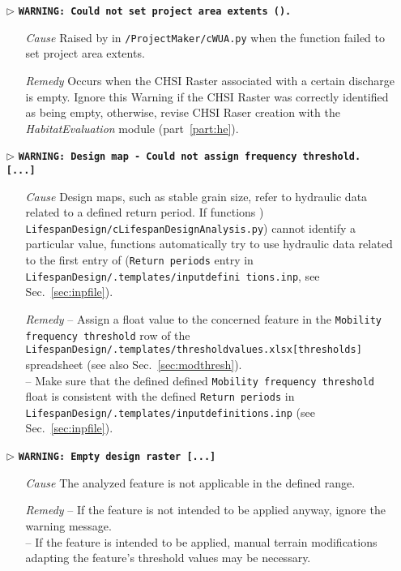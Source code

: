 \begin{itemize}
	\item[$\triangleright$]\textbf{\texttt{WARNING: Could not set project area extents ().}}
	\begin{itemize}
		\item[\textit{Cause}\hspace{0.27cm}] Raised by  in \texttt{/ProjectMaker/cWUA.py} when the function failed to set project area extents.
		\item[\textit{Remedy}] Occurs when the CHSI Raster associated with a certain discharge is empty. Ignore this Warning if the CHSI Raster was correctly identified as being empty, otherwise, revise CHSI Raser creation with the \textit{HabitatEvaluation} module (part~\ref{part:he}).\\		
	\end{itemize}
	
	\item[$\triangleright$]\textbf{\texttt{WARNING: Design map - Could not assign frequency threshold. [...]}}
	\begin{itemize}
		\item[\textit{Cause}\hspace{0.27cm}] Design maps, such as stable grain size, refer to hydraulic data related to a defined return period. If  functions ) \texttt{LifespanDesign/cLifespanDesignAnalysis.py}) cannot identify a particular  value,  functions automatically try to use hydraulic data related to the first entry of  (\texttt{Return periods} entry in \texttt{LifespanDesign/.templates/input{\myUnderscore}defini tions.inp}, see Sec.~\ref{sec:inpfile}).
		\item[\textit{Remedy}] -- Assign a float value to the concerned feature in the \texttt{Mobility frequency threshold} row of the \texttt{LifespanDesign/.templates/threshold{\myUnderscore}values.xlsx[thresholds]} spreadsheet (see also Sec.~\ref{sec:modthresh}).\\
			-- Make sure that the defined defined \texttt{Mobility frequency threshold} float is consistent with the defined \texttt{Return periods} in \texttt{LifespanDesign/.templates/input{\myUnderscore}definitions.inp} (see Sec.~\ref{sec:inpfile}).\\
	\end{itemize}
	
	\item[$\triangleright$]\textbf{\texttt{WARNING: Empty design raster [...]}}
	\begin{itemize}
		\item[\textit{Cause}\hspace{0.27cm}] The analyzed feature is not applicable in the defined range.
		\item[\textit{Remedy}] -- If the feature is not intended to be applied anyway, ignore the warning message.\\
							-- If the feature is intended to be applied, manual terrain modifications adapting the feature's threshold values may be necessary.\\
	\end{itemize}
	

\end{itemize}
